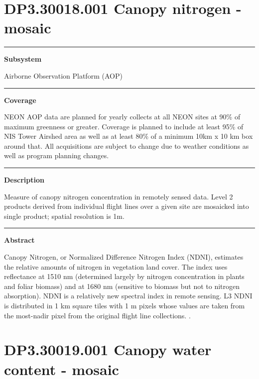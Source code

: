 \documentclass[]{article}
\begin{document}
\section{DP3.30018.001 Canopy nitrogen -
mosaic}\label{dp3.30018.001-canopy-nitrogen---mosaic}

\begin{center}\rule{0.5\linewidth}{\linethickness}\end{center}

\textbf{Subsystem}

Airborne Observation Platform (AOP)

\begin{center}\rule{0.5\linewidth}{\linethickness}\end{center}

\textbf{Coverage}

NEON AOP data are planned for yearly collects at all NEON sites at 90\%
of maximum greenness or greater. Coverage is planned to include at least
95\% of NIS Tower Airshed area as well as at least 80\% of a minimum
10km x 10 km box around that. All acquisitions are subject to change due
to weather conditions as well as program planning changes.

\begin{center}\rule{0.5\linewidth}{\linethickness}\end{center}

\textbf{Description}

Measure of canopy nitrogen concentration in remotely sensed data. Level
2 products derived from individual flight lines over a given site are
mosaicked into single product; spatial resolution is 1m.

\begin{center}\rule{0.5\linewidth}{\linethickness}\end{center}

\textbf{Abstract}

Canopy Nitrogen, or Normalized Difference Nitrogen Index (NDNI),
estimates the relative amounts of nitrogen in vegetation land cover. The
index uses reflectance at 1510 nm (determined largely by nitrogen
concentration in plants and foliar biomass) and at 1680 nm (sensitive to
biomass but not to nitrogen absorption). NDNI is a relatively new
spectral index in remote sensing. L3 NDNI is distributed in 1 km square
tiles with 1 m pixels whose values are taken from the most-nadir pixel
from the original flight line collections. \newpage
.

\section{DP3.30019.001 Canopy water content -
mosaic}\label{dp3.30019.001-canopy-water-content---mosaic}
\end{document}
